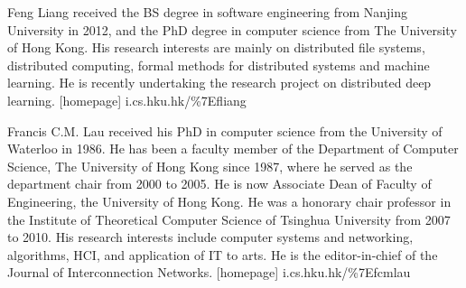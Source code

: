 \documentclass[10pt,journal,compsoc]{IEEEtran}
\begin{document}
\vspace{-0.5in}
\begin{IEEEbiography}{Feng Liang} received the BS degree in software engineering from Nanjing University in 2012, and the PhD degree in computer science from The University of Hong Kong. His research interests are mainly on distributed file systems, distributed computing, formal methods for distributed systems and machine learning. He is recently undertaking the research project on distributed deep learning.
[homepage] i.cs.hku.hk/\%7Efliang
\end{IEEEbiography}

\vspace{-0.5in}
\begin{IEEEbiography}{Francis C.M. Lau}
received his PhD in computer science from the University of Waterloo in 1986. He has been a faculty member of the Department of Computer Science, The University of Hong Kong since 1987, where he served as the department chair from 2000 to 2005. He is now Associate Dean of Faculty of Engineering, the University of Hong Kong. He was a honorary chair professor in the Institute of Theoretical Computer Science of Tsinghua University from 2007 to 2010. His research interests include
computer systems and networking, algorithms, HCI, and application of IT to arts. He is the editor-in-chief of the Journal of Interconnection Networks.
[homepage] i.cs.hku.hk/\%7Efcmlau
\end{IEEEbiography}
\end{document}
